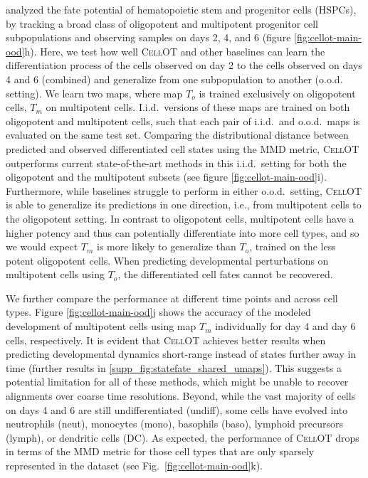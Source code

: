 \citet{weinreb2020lineage} analyzed the fate potential of hematopoietic stem and progenitor cells (HSPCs), by tracking a broad class of oligopotent %
and multipotent %
progenitor cell subpopulations and observing samples on days 2, 4, and 6 (figure \ref{fig:cellot-main-ood}h).
Here, we test how well \textsc{CellOT} and other baselines can learn the differentiation process of the cells observed on day 2 to the cells observed on days 4 and 6 (combined) and generalize from one subpopulation to another (o.o.d. setting).
We learn two maps, where map $T_o$ is trained exclusively on oligopotent cells, $T_m$ on multipotent cells.
I.i.d.~versions of these maps are trained on both oligopotent and multipotent cells, such that each pair of i.i.d.~and o.o.d.~maps is evaluated on the same test set.
Comparing the distributional distance between predicted and observed differentiated cell states using the MMD metric, \textsc{CellOT} outperforms current state-of-the-art methods in this i.i.d.~setting for both the oligopotent and the multipotent subsets (see figure \ref{fig:cellot-main-ood}i).
Furthermore, while baselines struggle to perform in either o.o.d.~setting, \textsc{CellOT} is able to generalize its predictions in one direction, i.e., from multipotent cells to the oligopotent setting.
In contrast to oligopotent cells, multipotent cells have a higher potency and thus can potentially differentiate into more cell types, and so we would expect $T_m$ is more likely to generalize than $T_o$, trained on the less potent oligopotent cells.
When predicting developmental perturbations on multipotent cells using $T_o$, the differentiated cell fates cannot be recovered.

We further compare the performance at different time points and across cell types.
Figure \ref{fig:cellot-main-ood}j shows the accuracy of the modeled development of multipotent cells using map $T_m$ individually for day 4 and day 6 cells, respectively.
It is evident that \textsc{CellOT} achieves better results when predicting developmental dynamics short-range instead of states further away in time (further results in \ref{supp_fig:statefate_shared_umaps}).
This suggests a potential limitation for all of these methods, which might be unable to recover alignments over coarse time resolutions.
Beyond, while the vast majority of cells on days 4 and 6 are still undifferentiated (undiff), some cells have evolved into neutrophils (neut), monocytes (mono), basophils (baso), lymphoid precursors (lymph), or dendritic cells (DC).
As expected, the performance of \textsc{CellOT} drops in terms of the MMD metric for those cell types that are only sparsely represented in the dataset (see Fig.~\ref{fig:cellot-main-ood}k).
